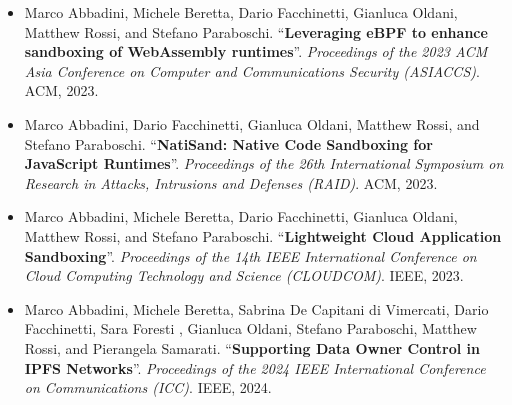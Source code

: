 \begin{itemize}
    \nocite{enhance-wasm-sandbox}
    \item Marco Abbadini, Michele Beretta, Dario Facchinetti, Gianluca
        Oldani, Matthew Rossi, and Stefano Paraboschi.
        ``\textbf{Leveraging eBPF to enhance sandboxing of
        WebAssembly runtimes}''. {\em Proceedings of the 2023 ACM Asia
        Conference on Computer and Communications Security (ASIACCS)}.
        ACM, 2023.
    
    \nocite{natisand}
    \item Marco Abbadini, Dario Facchinetti, Gianluca Oldani, Matthew
        Rossi, and Stefano Paraboschi. ``\textbf{NatiSand: Native Code
        Sandboxing for JavaScript Runtimes}''. {\em Proceedings of the
        26th International Symposium on Research in Attacks,
        Intrusions and Defenses (RAID)}. ACM, 2023.

    \nocite{dmng}
    \item Marco Abbadini, Michele Beretta, Dario Facchinetti, Gianluca
        Oldani, Matthew Rossi, and Stefano Paraboschi.
        ``\textbf{Lightweight Cloud Application Sandboxing}''. {\em
        Proceedings of the 14th IEEE International Conference on Cloud
        Computing Technology and Science (CLOUDCOM)}. IEEE, 2023.

    \nocite{freya-ipfs}
    \item Marco Abbadini, Michele Beretta, Sabrina De Capitani di
        Vimercati, Dario Facchinetti, Sara Foresti , Gianluca Oldani,
        Stefano Paraboschi, Matthew Rossi, and Pierangela Samarati.
        ``\textbf{Supporting Data Owner Control in IPFS Networks}''.
        {\em Proceedings of the 2024 IEEE International Conference on
        Communications (ICC)}. IEEE, 2024.
\end{itemize}
